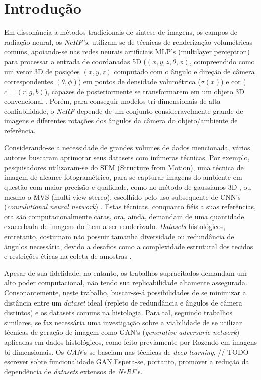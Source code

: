 \section{Introdução}
\label{sec:introducao}

Em dissonância a métodos tradicionais de síntese de imagens, os campos de radiação neural, os \textit{NeRF's}, utilizam-se de técnicas de renderização volumétricas comuns, apoiando-se nas redes neurais artificiais MLP's (multilayer perceptron) para processar a entrada de coordanadas 5D ($(x, y, z, \theta, \phi)$, compreendido como um vetor 3D de posições $(x, y, z)$ computado com o ângulo e direção de câmera correspondentes $(\theta, \phi)$) em pontos de densidade volumétrica ($\sigma (x)$) e cor ($c = (r, g, b)$), capazes de posteriormente se transformarem em um objeto 3D convencional \cite{mildenhall2020nerfrepresentingscenesneural}. Porém, para conseguir modelos tri-dimensionais de alta confiabilidade, o \textit{NeRF} depende de um conjunto consideravelmente grande de imagens e diferentes rotações dos ângulos da câmera do objeto/ambiente de referência.

Considerando-se a necessidade de grandes volumes de dados mencionada, vários autores buscaram aprimorar seus datasets com inúmeras técnicas. Por exemplo, pesquisadores utilizaram-se do SFM  (Structure from Motion), uma técnica de imagem de alcance fotogramétrico, para se capturar imagens do ambiente em questão com maior precisão e qualidade, como no método de gaussianos 3D \cite{kerbl3Dgaussians}, ou mesmo o MVS (multi-view stereo), escolhido pelo uso subsequente de CNN's (\textit{convulutional neural network}) \cite{chen2021mvsnerffastgeneralizableradiance}. Estas técnicas, conquanto fiéis a suas referências, ora são computacionalmente caras, ora, ainda, demandam de uma quantidade exacerbada de imagens do item a ser renderizado. \textit{Datasets} histológicos, entretanto, costumam não possuir tamanha diversidade ou redundância de ângulos necessária, devido a desafios como a complexidade estrutural dos tecidos e restrições éticas na coleta de amostras \cite{XUE2021101816}.

Apesar de sua fidelidade, no entanto, os trabalhos supracitados demandam um alto poder computacional, não tendo sua replicabilidade altamente assegurada. Consonantemente, neste trabalho, buscar-se-á possibilidades de se minimizar a distância entre um \textit{dataset} ideal (repleto de redundância e ângulos de câmera distintos) e os datasets comuns na histologia. Para tal, seguindo trabalhos similares, se faz necessária uma investigação sobre a viabilidade de se utilizar técnicas de geração de imagem como GAN's (\textit{generative adversarie network}) \cite{goodfellow2014generativeadversarialnetworks} aplicadas em dados histológicos, como feito previamente por Rozendo \cite{rozendo2024histdataaug} em imagens bi-dimensionais.   Os \textit{GAN}'s se baseiam nas técnicas de \textit{deep learning}, // TODO escrever sobre funcionalidade GAN.Espera-se, portanto, promover a redução da dependência de \textit{datasets} extensos de \textit{NeRF}'s. 


